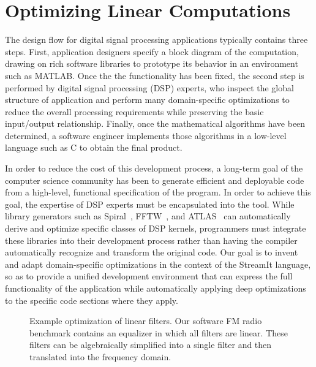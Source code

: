 \section{Optimizing Linear Computations}

The design flow for digital signal processing applications typically
contains three steps.  First, application designers specify a block
diagram of the computation, drawing on rich software libraries to
prototype its behavior in an environment such as MATLAB.  Once the the
functionality has been fixed, the second step is performed by digital
signal processing (DSP) experts, who inspect the global structure of
application and perform many domain-specific optimizations to reduce
the overall processing requirements while preserving the basic
input/output relationship.  Finally, once the mathematical algorithms
have been determined, a software engineer implements those algorithms
in a low-level language such as C to obtain the final product.

In order to reduce the cost of this development process, a long-term
goal of the computer science community has been to generate efficient
and deployable code from a high-level, functional specification of the
program.  In order to achieve this goal, the expertise of DSP experts
must be encapsulated into the tool.  While library generators such as
Spiral~\cite{Spiral-SI}, FFTW~\cite{FFTW-SI}, and
ATLAS~\cite{ATLAS,ATLAS-Sparsity-SI} can automatically derive and
optimize specific classes of DSP kernels, programmers must integrate
these libraries into their development process rather than having the
compiler automatically recognize and transform the original code.  Our
goal is to invent and adapt domain-specific optimizations in the
context of the StreamIt language, so as to provide a unified
development environment that can express the full functionality of the
application while automatically applying deep optimizations to the
specific code sections where they apply.

\begin{figure}[t]
\caption[Example optimization of linear filters]{Example optimization
  of linear filters.  Our software FM radio benchmark contains an
  equalizer in which all filters are linear.  These filters can be
  algebraically simplified into a single filter and then translated
  into the frequency domain. \protect\label{fig:equalizer}}
\end{figure}


